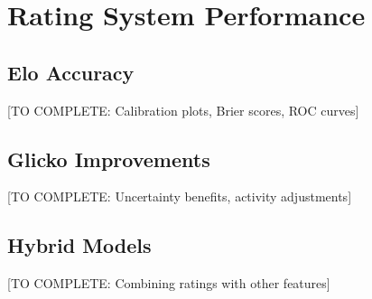 \section{Rating System Performance}

\subsection{Elo Accuracy}

[TO COMPLETE: Calibration plots, Brier scores, ROC curves]

\subsection{Glicko Improvements}

[TO COMPLETE: Uncertainty benefits, activity adjustments]

\subsection{Hybrid Models}

[TO COMPLETE: Combining ratings with other features]